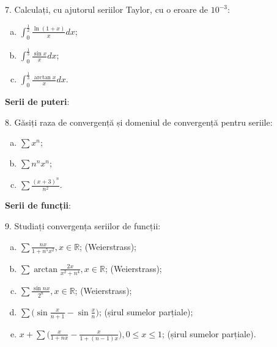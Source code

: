 \documentclass[11pt,a4paper]{article}
\newcommand\ds{\displaystyle}
\newcommand\RR{\mathbb{R}}
\theoremstyle{dotless}
\theoremstyle{dotlessdr}
\begin{document}
\vspace{1cm}

7. Calculați, cu ajutorul seriilor Taylor, cu o eroare de $10^{-3}$:
\begin{enumerate}[(a)]
\item $\ds\int_0^{\frac{1}{2}} \frac{\ln ( 1 + x )}{x} dx$;
\item $\ds\int_0^{\frac{1}{3}} \frac{\sin x}{x} dx$;
\item $\ds\int_0^{\frac{1}{3}} \frac{\arctan x}{x} dx$.
\end{enumerate}


\textbf{Serii de puteri}:

8. Găsiți raza de convergență și domeniul de convergență pentru seriile:
\begin{enumerate}[(a)]
\item $\sum x^n$;
\item $\sum n^n x^n$;
\item $\sum \frac{(x + 3)^n}{n^2}$.
\end{enumerate}


\textbf{Serii de funcții}:

9. Studiați convergența seriilor de funcții:
\begin{enumerate}[(a)]
\item $\sum \frac{nx}{1 + n^5 x^2}, x \in \RR$; \hfill (Weierstrass);
\item $\sum \arctan \frac{2x}{x^2 + n^4}, x \in \RR$; \hfill (Weierstrass);
\item $\sum \frac{\sin nx}{2^n}, x \in \RR$; \hfill (Weierstrass);
\item $\sum \Big( \sin \frac{x}{n + 1} - \sin \frac{x}{n} \Big)$; \hfill (șirul sumelor
  parțiale);
\item $x + \sum \Big( \frac{x}{1 + nx} - \frac{x}{1 + (n-1) x} \Big), 0 \leq x \leq 1$;
  \hfill (șirul sumelor parțiale).
\end{enumerate}
\end{document}
